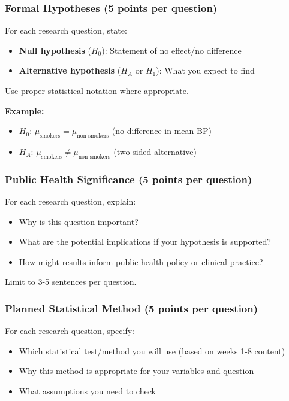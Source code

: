 \documentclass[11pt]{article}
\begin{document}
\subsubsection{Formal Hypotheses (5 points per question)}

For each research question, state:
\begin{itemize}
\item \textbf{Null hypothesis} ($H_0$): Statement of no effect/no difference
\item \textbf{Alternative hypothesis} ($H_A$ or $H_1$): What you expect to find
\end{itemize}

Use proper statistical notation where appropriate.

\textbf{Example:}
\begin{itemize}
\item $H_0$: $\mu_{\text{smokers}} = \mu_{\text{non-smokers}}$ (no difference in mean BP)
\item $H_A$: $\mu_{\text{smokers}} \neq \mu_{\text{non-smokers}}$ (two-sided alternative)
\end{itemize}

\subsubsection{Public Health Significance (5 points per question)}

For each research question, explain:
\begin{itemize}
\item Why is this question important?
\item What are the potential implications if your hypothesis is supported?
\item How might results inform public health policy or clinical practice?
\end{itemize}

Limit to 3-5 sentences per question.

\subsubsection{Planned Statistical Method (5 points per question)}

For each research question, specify:
\begin{itemize}
\item Which statistical test/method you will use (based on weeks 1-8 content)
\item Why this method is appropriate for your variables and question
\item What assumptions you need to check
\end{itemize}
\end{document}
